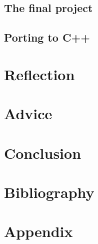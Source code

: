 \documentclass{article}
\begin{document}
\subsection{The final project}


\subsection{Porting to C++}




\newpage
\section{Reflection}

\newpage
\section{Advice}

\newpage
\section{Conclusion}

\newpage
\section{Bibliography}
\renewcommand{\bibname}{}
\printbibliography[heading=none]

\newpage
\section{Appendix}
\end{document}
